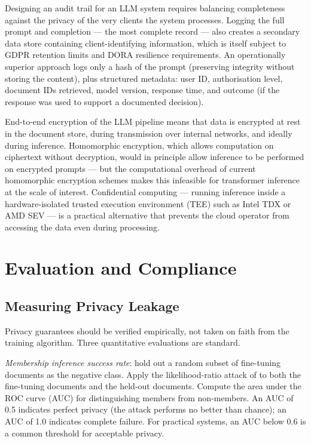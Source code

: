 Designing an audit trail for an LLM system requires balancing completeness against the privacy of the very clients the system processes. Logging the full prompt and completion — the most complete record — also creates a secondary data store containing client-identifying information, which is itself subject to GDPR retention limits and DORA resilience requirements. An operationally superior approach logs only a hash of the prompt (preserving integrity without storing the content), plus structured metadata: user ID, authorisation level, document IDs retrieved, model version, response time, and outcome (if the response was used to support a documented decision).

End-to-end encryption of the LLM pipeline means that data is encrypted at rest in the document store, during transmission over internal networks, and ideally during inference. Homomorphic encryption, which allows computation on ciphertext without decryption, would in principle allow inference to be performed on encrypted prompts — but the computational overhead of current homomorphic encryption schemes makes this infeasible for transformer inference at the scale of interest. Confidential computing — running inference inside a hardware-isolated trusted execution environment (TEE) such as Intel TDX or AMD SEV — is a practical alternative that prevents the cloud operator from accessing the data even during processing.

\section{Evaluation and Compliance}
\label{sec:ch15-evaluation}

\subsection{Measuring Privacy Leakage}
\label{sec:ch15-leakage-measurement}

Privacy guarantees should be verified empirically, not taken on faith from the training algorithm. Three quantitative evaluations are standard.

\emph{Membership inference success rate}: hold out a random subset of fine-tuning documents as the negative class. Apply the likelihood-ratio attack of \citet{carlini2021extracting} to both the fine-tuning documents and the held-out documents. Compute the area under the ROC curve (AUC) for distinguishing members from non-members. An AUC of 0.5 indicates perfect privacy (the attack performs no better than chance); an AUC of 1.0 indicates complete failure. For practical systems, an AUC below 0.6 is a common threshold for acceptable privacy.

